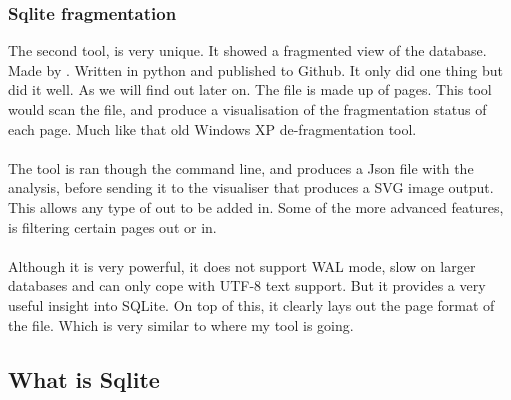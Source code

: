 \subsubsection{Sqlite fragmentation}
\label{subsubsec:sqlite_fragmentation}

The second tool, is very unique. It showed a fragmented view of the database. Made by \cite{sqlitefrag}. Written in python and published to Github. It only did one thing but did it well. As we will find out later on. The file is made up of pages. This tool would scan the file, and produce a visualisation of the fragmentation status of each page. Much like that old Windows XP de-fragmentation tool. 
\\\\
The tool is ran though the command line, and produces a Json file with the analysis, before sending it to the visualiser that produces a SVG image output. This allows any type of out to be added in. Some of the more advanced features, is filtering certain pages out or in. 
\\\\
Although it is very powerful, it does not support WAL mode, slow on larger databases and can only cope with UTF-8 text support. But it provides a very useful insight into SQLite. On top of this, it clearly lays out the page format of the file. Which is very similar to where my tool is going.

\subsection{What is Sqlite}
\label{subsec:what_is_sqlite}

